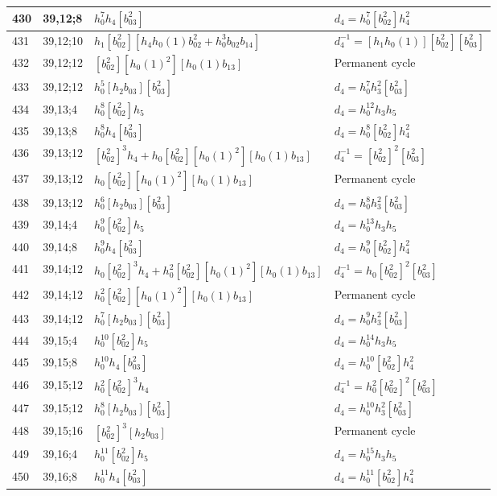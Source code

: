 \documentclass{article}
\begin{document}
\begin{longtable}{|l|l|>{\raggedright\arraybackslash}p{6cm}|>{\raggedright\arraybackslash}p{6cm}|}
\hline
430 & 39,12;8 & $h_0^7h_4[b_{03}^2]$ &$d_{4}=h_0^7[b_{02}^2]h_4^2$\\
\hline
431 & 39,12;10 & $h_1[b_{02}^2][h_4h_0(1)b_{02}^2 + h_0^3b_{02}b_{14}]$ & $d_{4}^{-1}=[h_1h_0(1)][b_{02}^2][b_{03}^2]$\\
\hline
432 & 39,12;12 & $[b_{02}^2][h_0(1)^2][h_0(1)b_{13}]$ & Permanent cycle\\
433 & 39,12;12 & $h_0^5[h_2b_{03}][b_{03}^2]$ &$d_{4}=h_0^7h_3^2[b_{03}^2]$\\
\hline
434 & 39,13;4 & $h_0^8[b_{02}^2]h_5$ &$d_{4}=h_0^{12}h_3h_5$\\
\hline
435 & 39,13;8 & $h_0^8h_4[b_{03}^2]$ &$d_{4}=h_0^8[b_{02}^2]h_4^2$\\
\hline
436 & 39,13;12 & $[b_{02}^2]^3h_4 + h_0[b_{02}^2][h_0(1)^2][h_0(1)b_{13}]$ & $d_{4}^{-1}=[b_{02}^2]^2[b_{03}^2]$\\
437 & 39,13;12 & $h_0[b_{02}^2][h_0(1)^2][h_0(1)b_{13}]$ & Permanent cycle\\
438 & 39,13;12 & $h_0^6[h_2b_{03}][b_{03}^2]$ &$d_{4}=h_0^8h_3^2[b_{03}^2]$\\
\hline
439 & 39,14;4 & $h_0^9[b_{02}^2]h_5$ &$d_{4}=h_0^{13}h_3h_5$\\
\hline
440 & 39,14;8 & $h_0^9h_4[b_{03}^2]$ &$d_{4}=h_0^9[b_{02}^2]h_4^2$\\
\hline
441 & 39,14;12 & $h_0[b_{02}^2]^3h_4 + h_0^2[b_{02}^2][h_0(1)^2][h_0(1)b_{13}]$ & $d_{4}^{-1}=h_0[b_{02}^2]^2[b_{03}^2]$\\
442 & 39,14;12 & $h_0^2[b_{02}^2][h_0(1)^2][h_0(1)b_{13}]$ & Permanent cycle\\
443 & 39,14;12 & $h_0^7[h_2b_{03}][b_{03}^2]$ &$d_{4}=h_0^9h_3^2[b_{03}^2]$\\
\hline
444 & 39,15;4 & $h_0^{10}[b_{02}^2]h_5$ &$d_{4}=h_0^{14}h_3h_5$\\
\hline
445 & 39,15;8 & $h_0^{10}h_4[b_{03}^2]$ &$d_{4}=h_0^{10}[b_{02}^2]h_4^2$\\
\hline
446 & 39,15;12 & $h_0^2[b_{02}^2]^3h_4$ & $d_{4}^{-1}=h_0^2[b_{02}^2]^2[b_{03}^2]$\\
447 & 39,15;12 & $h_0^8[h_2b_{03}][b_{03}^2]$ &$d_{4}=h_0^{10}h_3^2[b_{03}^2]$\\
\hline
448 & 39,15;16 & $[b_{02}^2]^3[h_2b_{03}]$ & Permanent cycle\\
\hline
449 & 39,16;4 & $h_0^{11}[b_{02}^2]h_5$ &$d_{4}=h_0^{15}h_3h_5$\\
\hline
450 & 39,16;8 & $h_0^{11}h_4[b_{03}^2]$ &$d_{4}=h_0^{11}[b_{02}^2]h_4^2$\\

\end{longtable}
\end{document}
